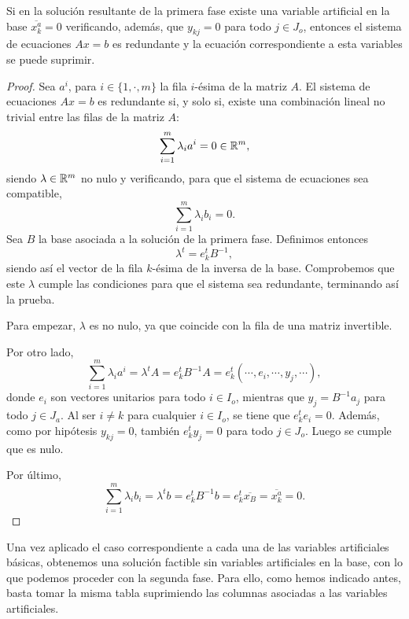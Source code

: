 \begin{lem}
	Si en la solución resultante de la primera fase existe una variable artificial en la base $\overline{x^a_k}=0$ verificando, además, que $y_{kj}=0$ para todo $j\in J_o$, entonces el sistema de ecuaciones $Ax=b$ es redundante y la ecuación correspondiente a esta variables se puede suprimir.
\end{lem}
\begin{proof}
	Sea $a^i$, para $i\in\{1,\cdot,m\}$ la fila $i$-ésima de la matriz $A$. El sistema de ecuaciones $Ax=b$ es redundante si, y solo si, existe una combinación lineal no trivial entre las filas de la matriz $A$:
	\begin{equation*}
		\sum_{i=1}^m\lambda_ia^i=0\in\mathbb{R}^m,
	\end{equation*}
	siendo $\lambda\in\mathbb{R}^m$ no nulo y verificando, para que el sistema de ecuaciones sea compatible,
	\begin{equation*}
		\sum_{i=1}^m\lambda_ib_i=0.
	\end{equation*}
	Sea $B$ la base asociada a la solución de la primera fase. Definimos entonces
	\begin{equation*}
		\lambda^t=e_k^tB^{-1},
	\end{equation*}
	siendo así el vector de la fila $k$-ésima de la inversa de la base. Comprobemos que este $\lambda$ cumple las condiciones para que el sistema sea redundante, terminando así la prueba.
	
	Para empezar, $\lambda$ es no nulo, ya que coincide con la fila de una matriz invertible.
	
	Por otro lado, 
	\begin{equation*}
		\sum_{i=1}^m\lambda_ia^i=\lambda^t A=e^t_kB^{-1}A=e^t_k(\cdots,e_i,\cdots,y_j,\cdots),
	\end{equation*}
	donde $e_i$ son vectores unitarios para todo $i\in I_o$, mientras que $y_j=B^{-1}a_j$ para todo $j\in J_a$. Al ser $i\not=k$ para cualquier $i\in I_o$, se tiene que $e^t_ke_i=0$. Además, como por hipótesis $y_{kj}=0$, también $e^t_ky_j=0$ para todo $j\in J_o$. Luego se cumple que es nulo.
	
	Por último, 
	\begin{equation*}
		\sum_{i=1}^m\lambda_ib_i=\lambda^t b=e^t_kB^{-1}b=e^t_k\overline{x_B}=\overline{x_k^a}=0.
	\end{equation*}
\end{proof}
Una vez aplicado el caso correspondiente a cada una de las variables artificiales básicas, obtenemos una solución factible sin variables artificiales en la base, con lo que podemos proceder con la segunda fase. Para ello, como hemos indicado antes, basta tomar la misma tabla suprimiendo las columnas asociadas a las variables artificiales.

